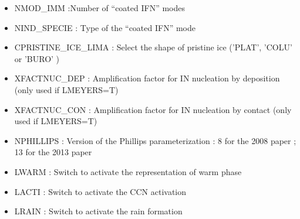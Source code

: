 \begin{itemize}
\item
{}
NMOD\_IMM :Number of “coated IFN” modes
\item
{}
NIND\_SPECIE : Type of the “coated IFN” mode
\item
{}
CPRISTINE\_ICE\_LIMA : Select the shape of pristine ice ('PLAT', 'COLU' or 'BURO' )
\item
{}
XFACTNUC\_DEP : Amplification factor for IN nucleation by deposition (only used if LMEYERS=T)
\item
{}
XFACTNUC\_CON : Amplification factor for IN  nucleation by contact (only used if LMEYERS=T)
\item
{}
NPHILLIPS : Version of the Phillips parameterization : 8 for the 2008 paper ; 13 for the 2013 paper
\item
{}
LWARM : Switch to activate the representation of warm phase
\item
{}
LACTI : Switch to activate the CCN activation 
\item
{}
LRAIN : Switch to activate the rain formation


\end{itemize}
